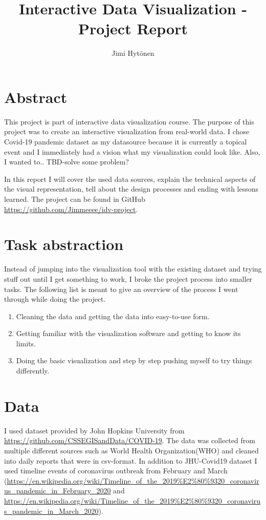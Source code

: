 \documentclass[11pt]{article}
\title{Interactive Data Visualization - Project Report}
\author{
    Jimi Hytönen
}
\begin{document}
\maketitle

\vspace{0.5cm}
\section{Abstract}
This project is part of interactive data visualization course. The purpose of this project was to create an interactive visualization from real-world data. I chose Covid-19 pandemic dataset as my datasource because it is currently a topical event and I immediately had a vision what my visualization could look like. Also, I wanted to.. TBD-solve some problem?

In this report I will cover the used data sources, explain the technical aspects of the visual representation, tell about the design processes and ending with lessons learned. The project can be found in GitHub \\ \url{https://github.com/Jimmeeee/idv-project}.

\section{Task abstraction}
Instead of jumping into the visualization tool with the existing dataset and trying stuff out until I get something to work, I broke the project process into smaller tasks. The following list is meant to give an overview of the process I went through while doing the project.
\begin{enumerate}
\item
Cleaning the data and getting the data into easy-to-use form.
\item
Getting familiar with the visualization software and getting to know its limits.
\item
Doing the basic visualization and step by step pushing myself to try things differently.
\end{enumerate}

\newpage
\section{Data}
I used dataset provided by John Hopkins University from \url{https://github.com/CSSEGISandData/COVID-19}. The data was collected from multiple different sources such as World Health Organization(WHO) and cleaned into daily reports that were in csv-format.
In addition to JHU-Covid19 dataset I used timeline events of coronavirus outbreak from February and March (\url{https://en.wikipedia.org/wiki/Timeline_of_the_2019%E2%80%9320_coronavirus_pandemic_in_February_2020} and \url{https://en.wikipedia.org/wiki/Timeline_of_the_2019%E2%80%9320_coronavirus_pandemic_in_March_2020}).
\end{document}
